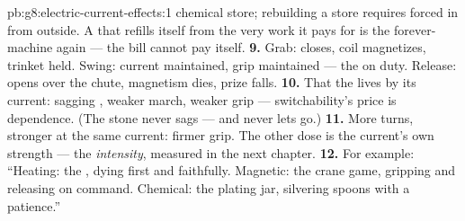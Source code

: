 \begin{solution}{pb:g8:electric-current-effects:1}
chemical store; rebuilding a store requires  forced in
from outside. A  that refills itself from the very work
it pays for is the forever-machine again --- the  bill
cannot pay itself.
\textbf{9.} Grab:  closes, coil magnetizes, trinket held.
Swing: current maintained, grip maintained --- the  on duty. Release:  opens over the chute, magnetism
dies, prize falls.
\textbf{10.} That the  lives by its current: sagging
, weaker march, weaker grip --- switchability's price is
dependence. (The stone  never sags --- and never lets
go.)
\textbf{11.} More turns, stronger  at the same current:
firmer grip. The other dose is the current's own strength ---
the \emph{intensity}, measured in the next chapter.
\textbf{12.} For example: ``Heating: the , dying first and
faithfully. Magnetic: the crane game, gripping and releasing on
command. Chemical: the plating jar, silvering spoons with a
 patience.''
\end{solution}
